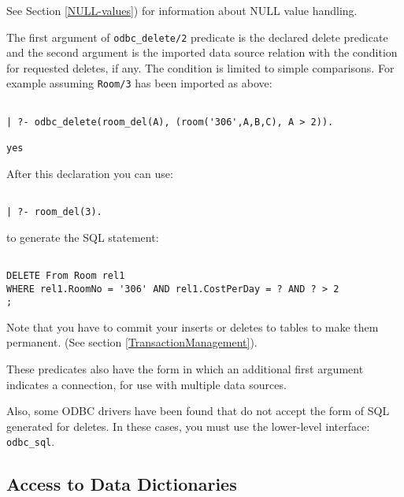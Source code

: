 See Section \ref{NULL-values}) for information about NULL value
handling.

The first argument of {\tt odbc\_delete/2} predicate is the declared delete
predicate and the second argument is the imported data source relation
with the condition for requested deletes, if any.  The condition is
limited to simple comparisons.  For example assuming
{\tt Room/3} has been imported as above:
\begin{verbatim}

| ?- odbc_delete(room_del(A), (room('306',A,B,C), A > 2)). 

yes
\end{verbatim}

After this declaration you can use:
\begin{verbatim}

| ?- room_del(3).
\end{verbatim}

to generate the SQL statement:
\begin{verbatim}

DELETE From Room rel1 
WHERE rel1.RoomNo = '306' AND rel1.CostPerDay = ? AND ? > 2
;
\end{verbatim}

Note that you have to commit your inserts or deletes to tables to make
them permanent.  (See section \ref{TransactionManagement}).

These predicates also have the form in which an additional first
argument indicates a connection, for use with multiple data sources.

Also, some ODBC drivers have been found that do not accept the form of
SQL generated for deletes.  In these cases, you must use the
lower-level interface: {\tt odbc\_sql}.

\subsection{Access to Data Dictionaries}

